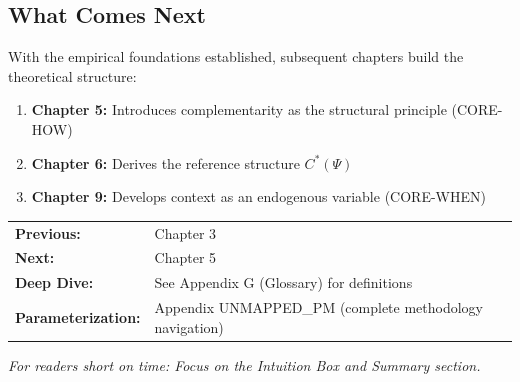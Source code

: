 \subsection{What Comes Next}
\label{sec:ch4-next}

With the empirical foundations established, subsequent chapters build the theoretical structure:

\begin{enumerate}[nosep]
    \item \textbf{Chapter 5:} Introduces complementarity as the structural principle (CORE-HOW)
    \item \textbf{Chapter 6:} Derives the reference structure $C^*(\Psi)$
    \item \textbf{Chapter 9:} Develops context as an endogenous variable (CORE-WHEN)
\end{enumerate}

\begin{tcolorbox}[
    colback=green!5!white,
    colframe=green!75!black,
    title={\textbf{Reading Path}},
    fonttitle=\bfseries
]
\begin{tabular}{@{}ll@{}}
\textbf{Previous:} & Chapter 3 \\
\textbf{Next:} & Chapter 5 \\
\textbf{Deep Dive:} & See Appendix G (Glossary) for definitions \\
\textbf{Parameterization:} & Appendix UNMAPPED_PM (complete methodology navigation) \\
\end{tabular}

\medskip
\textit{For readers short on time: Focus on the Intuition Box and Summary section.}
\end{tcolorbox}

